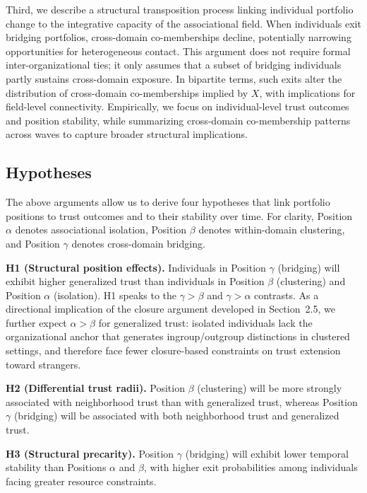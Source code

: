 Third, we describe a structural transposition process linking individual portfolio change to the integrative capacity of the associational field. When individuals exit bridging portfolios, cross-domain co-memberships decline, potentially narrowing opportunities for heterogeneous contact. This argument does not require formal inter-organizational ties; it only assumes that a subset of bridging individuals partly sustains cross-domain exposure. In bipartite terms, such exits alter the distribution of cross-domain co-memberships implied by $X$, with implications for field-level connectivity. Empirically, we focus on individual-level trust outcomes and position stability, while summarizing cross-domain co-membership patterns across waves to capture broader structural implications.


\subsection{Hypotheses}

The above arguments allow us to derive four hypotheses that link portfolio positions to trust outcomes and to their stability over time. For clarity, Position $\alpha$ denotes associational isolation, Position $\beta$ denotes within-domain clustering, and Position $\gamma$ denotes cross-domain bridging.


\textbf{H1 (Structural position effects).} Individuals in Position $\gamma$ (bridging) will exhibit higher generalized trust than individuals in Position $\beta$ (clustering) and Position $\alpha$ (isolation). H1 speaks to the $\gamma > \beta$ and $\gamma > \alpha$ contrasts. As a directional implication of the closure argument developed in Section~2.5, we further expect $\alpha > \beta$ for generalized trust: isolated individuals lack the organizational anchor that generates ingroup/outgroup distinctions in clustered settings, and therefore face fewer closure-based constraints on trust extension toward strangers.

\textbf{H2 (Differential trust radii).} Position $\beta$ (clustering) will be more strongly associated with neighborhood trust than with generalized trust, whereas Position $\gamma$ (bridging) will be associated with both neighborhood trust and generalized trust.

\textbf{H3 (Structural precarity).} Position $\gamma$ (bridging) will exhibit lower temporal stability than Positions $\alpha$ and $\beta$, with higher exit probabilities among individuals facing greater resource constraints.

